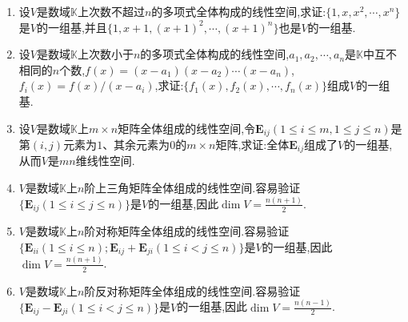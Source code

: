 \documentclass[../../main.tex]{subfiles}%
\begin{document}
\begin{example}[$\,\,$一些常见线性空间的基]\label{example:一些常见线性空间的基}
\begin{enumerate}[(1)]
\item \label{example:一些常见线性空间的基(1)}设\(V\)是数域\(\mathbb{K}\)上次数不超过\(n\)的多项式全体构成的线性空间,求证:\(\{1,x,x^2,\cdots,x^n\}\)是\(V\)的一组基,并且\(\{1,x + 1,(x + 1)^2,\cdots,(x + 1)^n\}\)也是\(V\)的一组基.
\item  \label{example:一些常见线性空间的基(2)}设\(V\)是数域\(\mathbb{K}\)上次数小于\(n\)的多项式全体构成的线性空间,\(a_1,a_2,\cdots,a_n\)是\(\mathbb{K}\)中互不相同的\(n\)个数,\(f(x)=(x - a_1)(x - a_2)\cdots(x - a_n)\),\(f_i(x)=f(x)/(x - a_i)\),求证:\(\{f_1(x),f_2(x),\cdots,f_n(x)\}\)组成\(V\)的一组基.
\item \label{example:一些常见线性空间的基(3)}设\(V\)是数域\(\mathbb{K}\)上\(m\times n\)矩阵全体组成的线性空间,令\(\boldsymbol{E}_{ij}(1\leqslant  i\leqslant  m,1\leqslant  j\leqslant  n)\)是第\((i,j)\)元素为\(1\)、其余元素为\(0\)的\(m\times n\)矩阵,求证:全体\(\boldsymbol{E}_{ij}\)组成了\(V\)的一组基,从而\(V\)是\(mn\)维线性空间.
\item  \label{example:一些常见线性空间的基(4)}\(V\)是数域\(\mathbb{K}\)上\(n\)阶上三角矩阵全体组成的线性空间.容易验证\(\{\boldsymbol{E}_{ij}(1\leqslant  i\leqslant  j\leqslant  n)\}\)是\(V\)的一组基,因此\(\dim V=\frac{n(n + 1)}{2}\).
\item  \label{example:一些常见线性空间的基(5)}\(V\)是数域\(\mathbb{K}\)上\(n\)阶对称矩阵全体组成的线性空间.容易验证\(\{\boldsymbol{E}_{ii}(1\leqslant  i\leqslant  n);\boldsymbol{E}_{ij}+\boldsymbol{E}_{ji}(1\leqslant  i< j\leqslant  n)\}\)是\(V\)的一组基,因此\(\dim V=\frac{n(n + 1)}{2}\).
\item  \label{example:一些常见线性空间的基(6)}\(V\)是数域\(\mathbb{K}\)上\(n\)阶反对称矩阵全体组成的线性空间.容易验证\(\{\boldsymbol{E}_{ij}-\boldsymbol{E}_{ji}(1\leqslant  i< j\leqslant  n)\}\)是\(V\)的一组基,因此\(\dim V=\frac{n(n - 1)}{2}\).
\end{enumerate}
\end{example}
\end{document}
